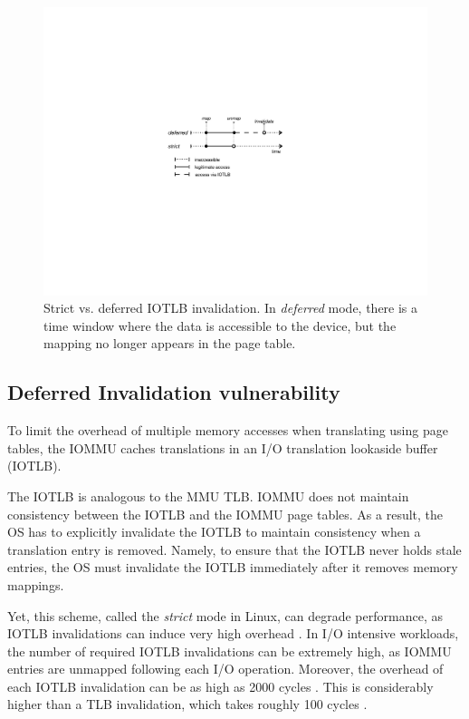 \begin{figure}[t]
    \centering
    \includegraphics[width=0.9\columnwidth]{figs/strict.pdf}
    \caption{Strict vs. deferred IOTLB invalidation. In \emph{deferred} mode, there is a time window where the data is accessible to the device, but the mapping no longer appears in the page table.}
    \label{fig:deferred}
\end{figure}

\subsection{Deferred Invalidation vulnerability}\label{sec:deferred}

To limit the overhead of multiple memory accesses when translating \iova{} using page tables, the IOMMU caches translations in an I/O translation lookaside buffer (IOTLB). 

The IOTLB is analogous to the MMU TLB. IOMMU does not maintain consistency between the IOTLB and the IOMMU page tables. As a result, the OS has to explicitly invalidate the IOTLB to maintain consistency when a translation entry is removed. Namely, to ensure that the IOTLB never holds stale entries, the OS must invalidate the IOTLB immediately after it removes memory mappings. 

Yet, this scheme, called the \emph{strict} mode in Linux, can degrade performance, as IOTLB invalidations can induce very high overhead \cite{MMT16,MSMT18,Peleg15}. In I/O intensive workloads, the number of required IOTLB invalidations can be extremely high, as IOMMU entries are unmapped following each I/O operation. Moreover, the overhead of each IOTLB invalidation can be as high as 2000 cycles \cite{ABYTS11}. This is considerably higher than a TLB invalidation, which takes roughly 100 cycles \cite{Han14}. 

